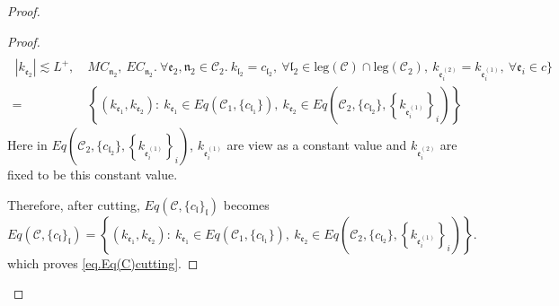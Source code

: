 \begin{proof}
\begin{proof}
\begin{equation}
\begin{split}
    \\
    \ |k_{\mathfrak{e}_2}| \lesssim L^+,\ &MC_{\mathfrak{n}_2},\  EC_{\mathfrak{n}_2}.\ \forall \mathfrak{e}_2, \mathfrak{n}_2\in\mathcal{C}_2.\ k_{\mathfrak{l}_2}=c_{\mathfrak{l}_2},\ \forall \mathfrak{l}_2\in \text{leg}(\mathcal{C})\cap \text{leg}(\mathcal{C}_2),\ k_{\mathfrak{e}_{i}^{(2)}}=k_{\mathfrak{e}_{i}^{(1)}},\ \forall\mathfrak{e}_{i}\in c\}
    \\
    =&\left\{(k_{\mathfrak{e}_1},k_{\mathfrak{e}_{2}}):\ k_{\mathfrak{e}_1}\in Eq(\mathcal{C}_1,\{c_{\mathfrak{l}_1}\}),\  k_{\mathfrak{e}_{2}}\in Eq\left(\mathcal{C}_{2}, \{c_{\mathfrak{l}_2}\}, \left\{k_{\mathfrak{e}_{i}^{(1)}}\right\}_{i}\right)\right\}
\end{split}
\end{equation}
Here in $Eq\left(\mathcal{C}_{2}, \{c_{\mathfrak{l}_2}\}, \left\{k_{\mathfrak{e}_{i}^{(1)}}\right\}_{i}\right)$, $k_{\mathfrak{e}_{i}^{(1)}}$ are view as a constant value and $k_{\mathfrak{e}_{i}^{(2)}}$ are fixed to be this constant value.

Therefore, after cutting, $Eq(\mathcal{C},\{c_{\mathfrak{l}}\}_{\mathfrak{l}})$ becomes
\begin{equation}
    Eq(\mathcal{C},\{c_{\mathfrak{l}}\}_{\mathfrak{l}})=\left\{(k_{\mathfrak{e}_1},k_{\mathfrak{e}_{2}}):\ k_{\mathfrak{e}_1}\in Eq(\mathcal{C}_1,\{c_{\mathfrak{l}_1}\}),\  k_{\mathfrak{e}_{2}}\in Eq\left(\mathcal{C}_{2}, \{c_{\mathfrak{l}_2}\}, \left\{k_{\mathfrak{e}_{i}^{(1)}}\right\}_{i}\right)\right\}.
\end{equation}
which proves \eqref{eq.Eq(C)cutting}.


\end{proof}
\end{proof}
